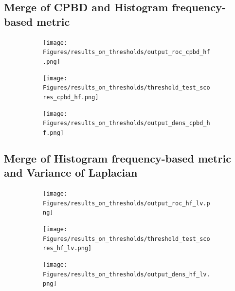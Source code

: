\iffalse
\subsection{Merge of CPBD and Histogram frequency-based metric}
\begin{figure}[H]
    \centering
    \begin{subfigure}[t]{0.48\textwidth}
        \texttt{[image: Figures/results\_on\_thresholds/output\_roc\_cpbd\_hf.png]}
        \caption{}
        \label{fig:CPBD_HF_roc}
    \end{subfigure}\hspace{1em}
    \begin{subfigure}[t]{0.48\textwidth}
        \texttt{[image: Figures/results\_on\_thresholds/threshold\_test\_scores\_cpbd\_hf.png]}
        \caption{}
        \label{fig:CPBD_HF_thresh}
    \end{subfigure}\hspace{1em}
    \begin{subfigure}[t]{0.48\textwidth}
        \texttt{[image: Figures/results\_on\_thresholds/output\_dens\_cpbd\_hf.png]}
        \caption{}
        \label{fig:CPBD_HF_dens}
    \end{subfigure}\hspace{1em}
    \caption{}
    \label{fig:CPBD_HF_final}
\end{figure}

\subsection{Merge of Histogram frequency-based metric and Variance of Laplacian}
\begin{figure}[H]
    \centering
    \begin{subfigure}[t]{0.48\textwidth}
        \texttt{[image: Figures/results\_on\_thresholds/output\_roc\_hf\_lv.png]}
        \caption{}
        \label{fig:HF_LV_roc}
    \end{subfigure}\hspace{1em}
    \begin{subfigure}[t]{0.48\textwidth}
        \texttt{[image: Figures/results\_on\_thresholds/threshold\_test\_scores\_hf\_lv.png]}
        \caption{}
        \label{fig:HF_LV_thresh}
    \end{subfigure}\hspace{1em}
    \begin{subfigure}[t]{0.48\textwidth}
        \texttt{[image: Figures/results\_on\_thresholds/output\_dens\_hf\_lv.png]}
        \caption{}
        \label{fig:HF_LV_dens}
    \end{subfigure}\hspace{1em}
    \caption{}
    \label{fig:HF_LV_final}
\end{figure}

